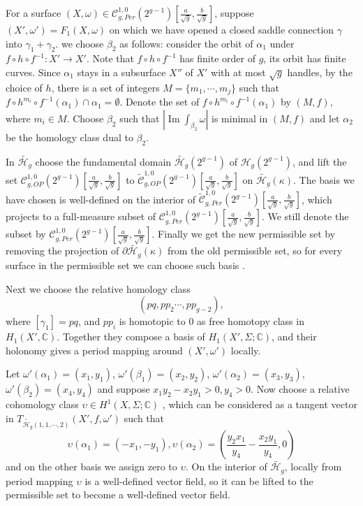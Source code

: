 \documentclass[12pt]{amsart} %
\theoremstyle{definition}
\theoremstyle{remark}
\numberwithin{equation}{section}
\renewcommand\H{{\mathcal H}}
\begin{document}
For a surface $(X,\omega)\in \mathcal{C}^{1,0}_{g,Per}(2^{g-1})[\frac{a}{\sqrt{g}},\frac{b}{\sqrt{g}}]$, suppose $(X',\omega')=F_1(X,\omega)$ on which we have opened a closed saddle connection $\gamma$ into $\gamma_1+\gamma_2$.
we choose $\beta_2$ as follows: consider the orbit of $\alpha_1$ under $f\circ h \circ f^{-1}: X'\to X'$. 
Note that $f\circ h \circ f^{-1}$ has finite order of $g$, its orbit has finite curves.
Since $\alpha_1$ stays in a subsurface $X''$ of $X'$ with at most $\sqrt{g}$ handles, by the choice of $h$, 
there is a set of integers $M=\{m_1,\cdots ,m_j\}$ such that $f\circ h^{m_i} \circ f^{-1} (\alpha_1) \cap \alpha_1=\emptyset$.
Denote the set of $f\circ h^{m_i} \circ f^{-1} (\alpha_1)$ by $(M,f)$, where $m_i\in M$.
Choose $\beta_2$ such that $|\operatorname{Im}\int_{\beta_2}\omega|$ is minimal in $(M,f)$
and let $\alpha_2$ be the homology class dual to $\beta_2$.
\fi

In $\tilde{\H_g}$ choose the fundamental domain $\tilde{\H_g}(2^{g-1})$ of $\H_g(2^{g-1})$, and 
lift the set $\mathcal{C}^{1,0}_{g,OP}(2^{g-1})[\frac{a}{\sqrt{g}},\frac{b}{\sqrt{g}}]$ to $\tilde{\mathcal{C}}^{1,0}_{g,OP}(2^{g-1})[\frac{a}{\sqrt{g}},\frac{b}{\sqrt{g}}]$
on $\tilde{\H_g}(\kappa)$.
The basis we have chosen is well-defined on the interior of $\tilde{\mathcal{C}}^{1,0}_{g,Per}(2^{g-1})[\frac{a}{\sqrt{g}},\frac{b}{\sqrt{g}}]$,
which projects to a full-measure subset of $\mathcal{C}^{1,0}_{g,Per}(2^{g-1})[\frac{a}{\sqrt{g}},\frac{b}{\sqrt{g}}]$.
We still denote the subset by $\mathcal{C}^{1,0}_{g,Per}(2^{g-1})[\frac{a}{\sqrt{g}},\frac{b}{\sqrt{g}}]$.
Finally we get the new permissible set by removing the projection of $\partial{\tilde{\H_g}(\kappa)}$ from the old permissible set, 
so for every surface in the permissible set we can choose such basis .

Next we choose the relative homology class
$$(pq,pp_2\cdots,pp_{g-2}),$$
where $[\gamma_1]=pq$, and $pp_i$ is  homotopic to $0$ as free homotopy class in $H_1(X',\mathbb{C})$. 
Together they compose a basis of $H_1(X',\Sigma;\mathbb{C})$, 
and their holonomy gives a period mapping around $(X',\omega')$ locally.

Let $\omega'(\alpha_1)=(x_1,y_1)$, $\omega'(\beta_1)=(x_2,y_2)$, $\omega'(\alpha_2)=(x_3,y_3)$,
$\omega'(\beta_2)=(x_4,y_4)$ and suppose $x_1y_2-x_2y_1>0, y_4>0$.
Now choose a relative cohomology class $\upsilon \in H^1(X,\Sigma;\mathbb{C})$ ,
which can be considered as a tangent vector in $T_{\tilde{\H_g}(1,1,\cdots,2)}(X',f, \omega')$ such that
\begin{equation}\label{moving}
\upsilon(\alpha_1)=(-x_1,-y_1), \upsilon(\alpha_2)=(\frac{y_2x_1}{y_4}-\frac{x_2y_1}{y_4},0)
\end{equation}
and on the other basis we assign zero to $\upsilon$. 
On the interior of $\tilde{\H_g}$, locally from period mapping $\upsilon$ is a well-defined vector field,
so it can be lifted to the permissible set to become a well-defined vector field.
\end{document}
